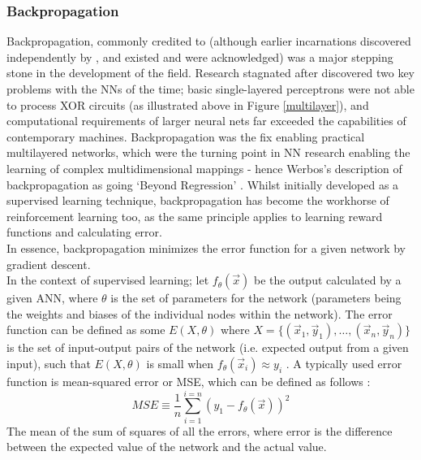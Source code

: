 \documentclass[12pt]{article}
\begin{document}
\subsubsection{Backpropagation}\label{backpropa}
Backpropagation, commonly credited to \textcite{rumelhart1986learning} (although earlier incarnations discovered independently by \textcite{bryson1969applied}, \textcite{werbos1974beyond} and \textcite{parker1985learning} existed and were acknowledged) was a major stepping stone in the development of the field. Research stagnated after \textcite{8093960} discovered two key problems with the NNs of the time; basic single-layered perceptrons were not able to process XOR circuits (as illustrated above in Figure \ref{multilayer}), and computational requirements of larger neural nets far exceeded the capabilities of contemporary machines. Backpropagation was the fix enabling practical multilayered networks, which were the turning point in NN research enabling the learning of complex multidimensional mappings - hence Werbos's description of backpropagation as going `Beyond Regression' \autocite{werbos1974beyond}.
Whilst initially developed as a supervised learning technique, backpropagation has become the workhorse of reinforcement learning too, as the same principle applies to learning reward functions and calculating error.\\\newline
In essence, backpropagation minimizes the error function for a given network by gradient descent.\\\newline
In the context of supervised learning; let $f_{\theta}(\vec{x})$ be the output calculated by a given ANN, where $\theta$ is the set of parameters for the network (parameters being the weights and biases of the individual nodes within the network). The error function can be defined as some $E(X,\theta)$ where $X = \{(\vec{x}_1,\vec{y}_1),\dots,(\vec{x}_n,\vec{y}_n)\}$ is the set of input-output pairs of the network (i.e. expected output from a given input), such that $E(X,\theta)$ is small when $f_{\theta}(\vec{x}_i) \approx y_i$ \autocite{118638}.
A typically used error function is mean-squared error or MSE, which can be defined as follows \autocite{ref1}:
\begin{equation}\label{mse}
    MSE \equiv \frac{1}{n}\sum\limits_{i=1}^{i=n}(y_1-f_{\theta}(\vec{x}))^2
\end{equation}
The mean of the sum of squares of all the errors, where error is the difference between the expected value of the network and the actual value.\\\newline
\end{document}
